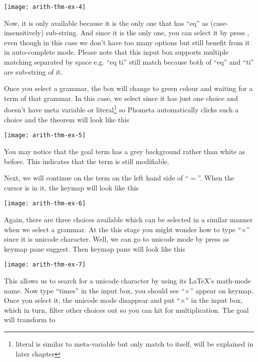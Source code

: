 \documentclass[master.tex]{subfiles}
\begin{document}
\begin{center}
\texttt{[image: arith-thm-ex-4]}
\end{center}

Now, it is only  available because it is the only one that has
``eq'' as (case-insensitively) sub-string. And since it is the only one, you can
select it by press , even though in this case we don't have too
many options but still benefit from it in auto-complete mode. Please note that
this input box supports multiple matching separated by space e.g. ``eq ti''
still match  because both of ``eq'' and ``ti'' are sub-string of
it.

Once you select a grammar, the box will change to green colour and waiting for a
term of that grammar. In this case, we select  since it has just
one choice and doesn't have meta variable or literal\footnote{literal is similar
  to meta-variable but only match to itself, will be explained in later
  chapter} so Phometa automatically clicks such a choice and the theorem will
look like this

\begin{center}
\texttt{[image: arith-thm-ex-5]}
\end{center}

You may notice that the goal term has a grey background rather than white as
before. This indicates that the term is still modifiable.

Next, we will continue on the  term on the left hand side of
``$=$''. When the cursor is in it, the keymap will look like this

\begin{center}
\texttt{[image: arith-thm-ex-6]}
\end{center}

Again, there are three choices available which can be selected in a similar
manner when we select a grammar. At the this stage you might wonder how to type
``$\times$'' since it is unicode character. Well, we can go to unicode mode by
press  as keymap pane suggest. Then keymap pane will look like this

\begin{center}
\texttt{[image: arith-thm-ex-7]}
\end{center}

This allows us to search for a unicode character by using its \LaTeX{}'s
math-mode name. Now type ``times'' in the input box, you should see ``$\times$''
appear on keymap. Once you select it, the unicode mode disappear and put
``$\times$'' in the input box, which in turn, filter other choices out so you
can hit  for multiplication. The goal will transform to
\end{document}

